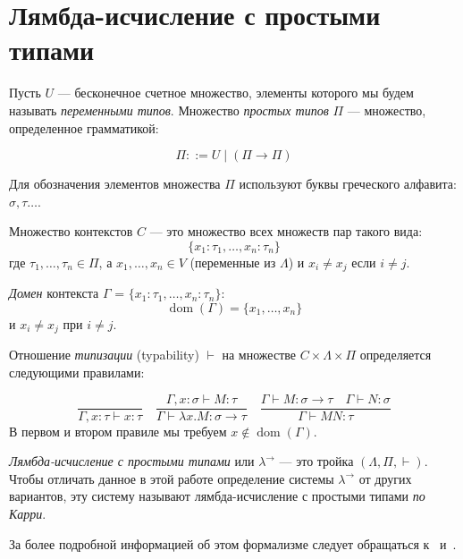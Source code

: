 \section{Лямбда-исчисление с простыми типами}
\begin{definition}
    Пусть $U$ — бесконечное счетное множество, элементы которого мы будем
    называть \emph{переменными типов}.
    Множество \emph{простых типов} $\Pi$ — множество, определенное грамматикой:

    $$ \Pi ::= U \mid (\Pi \to \Pi) $$

    Для обозначения элементов множества $\Pi$ используют буквы греческого алфавита:
    $\sigma, \tau \ldots $.
\end{definition}
\begin{definition}
    Множество контекстов $C$ — это множество всех множеств пар такого вида:
    $$ \{ x_1 : \tau_1 , \ldots , x_n : \tau_n \} $$
    где $ \tau_1 , \ldots , \tau_n \in \Pi$, а
    $ x_1 , \ldots , x_n \in V $ (переменные из $\Lambda$) и $x_i \neq x_j$ если $i \neq j$.
\end{definition}
\begin{definition}
    \emph{Домен} контекста $\Gamma$ = $ \{ x_1 : \tau_1 , \ldots , x_n : \tau_n \} $:
    $$ \operatorname{dom} (\Gamma) = \{ x_1 , \ldots , x_n \} $$ и $x_i \neq x_j$ при $i \neq j$.
\end{definition}
\begin{definition}
    Отношение \emph{типизации} (typability) $ \vdash $ на множестве
    $ C \times \Lambda \times \Pi $ определяется следующими правилами:

    $$ \frac {} {\Gamma, x : \tau \vdash x : \tau}
    \quad
    \frac{\Gamma, x : \sigma \vdash M : \tau}
    {\Gamma \vdash \lambda x . M : \sigma \to \tau}
    \quad
    \frac{\Gamma \vdash M : \sigma \to \tau \quad \Gamma \vdash N : \sigma}
    {\Gamma \vdash M N : \tau}
    $$
    В первом и втором правиле мы требуем $x \notin \operatorname{dom}(\Gamma).$
\end{definition}
\begin{definition}
    \emph{Лямбда-исчисление с простыми типами} или $\lambda^{\to}$ — это тройка
    $ (\Lambda , \Pi , \vdash) $.
    Чтобы отличать данное в этой работе определение системы $\lambda^{\to}$ от других вариантов,
    эту систему называют лямбда-исчисление с простыми типами \emph{по Карри}.
\end{definition}
За более подробной информацией об этом формализме следует
обращаться к~\cite{ChurchSTLC} и~\cite{Sorensen}.

